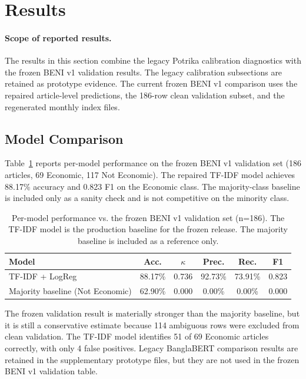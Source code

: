 
\section{Results}\label{sec:results}

\paragraph{Scope of reported results.}
The results in this section combine the legacy Potrika calibration diagnostics with the frozen BENI v1 validation results. The legacy calibration subsections are retained as prototype evidence. The current frozen BENI v1 comparison uses the repaired article-level predictions, the 186-row clean validation subset, and the regenerated monthly index files.

\subsection{Model Comparison}

Table~\ref{tab:model-comparison} reports per-model performance on the frozen BENI v1 validation set (186 articles, 69 Economic, 117 Not Economic). The repaired TF-IDF model achieves 88.17\% accuracy and 0.823 F1 on the Economic class. The majority-class baseline is included only as a sanity check and is not competitive on the minority class.

\begin{table}[h]
\centering
\begin{tabular}{lccccc}
\toprule
Model & Acc. & $\kappa$ & Prec. & Rec. & F1 \\
\midrule
TF-IDF + LogReg & 88.17\% & 0.736 & 92.73\% & 73.91\% & 0.823 \\
Majority baseline (Not Economic) & 62.90\% & 0.000 & 0.00\% & 0.00\% & 0.000 \\
\bottomrule
\end{tabular}
\caption{Per-model performance vs. the frozen BENI v1 validation set (n=186). The TF-IDF model is the production baseline for the frozen release. The majority baseline is included as a reference only.}
\label{tab:model-comparison}
\end{table}

The frozen validation result is materially stronger than the majority baseline, but it is still a conservative estimate because 114 ambiguous rows were excluded from clean validation. The TF-IDF model identifies 51 of 69 Economic articles correctly, with only 4 false positives. Legacy BanglaBERT comparison results are retained in the supplementary prototype files, but they are not used in the frozen BENI v1 validation table.

